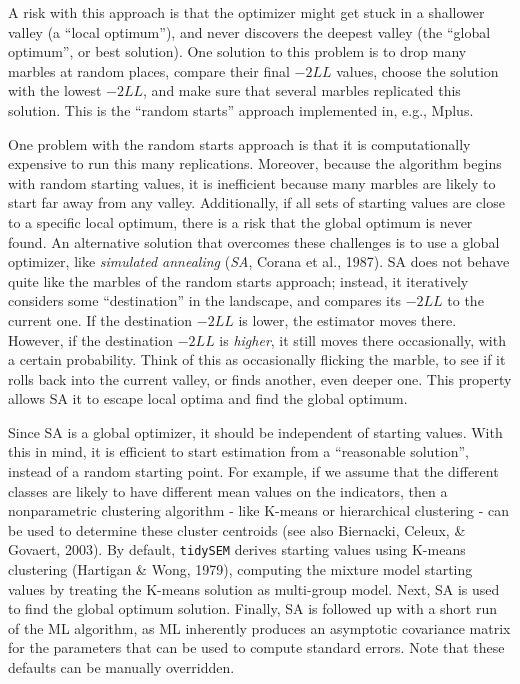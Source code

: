 \documentclass[
  ,man,floatsintext]{apa6}
\begin{document}
A risk with this approach is that the optimizer might get stuck in a shallower valley (a ``local optimum''),
and never discovers the deepest valley (the ``global optimum'', or best solution).
One solution to this problem is to drop many marbles at random places,
compare their final \(-2LL\) values,
choose the solution
with the lowest \(-2LL\), and make sure that several marbles replicated
this solution.
This is the ``random starts'' approach implemented in, e.g., Mplus.

One problem with the random starts approach is that it is
computationally expensive to run this many replications. Moreover,
because the algorithm begins with random starting values,
it is inefficient because many marbles are likely to start far away from any valley.
Additionally, if all sets of starting values are close to a specific local optimum,
there is a risk that the global optimum is never found.
An alternative solution that overcomes these challenges is to use a global optimizer, like \emph{simulated annealing} (\emph{SA}, Corana et al., 1987).
SA does not behave quite like the marbles of the random starts approach;
instead, it iteratively considers some ``destination'' in the landscape,
and compares its \(-2LL\) to the current one.
If the destination \(-2LL\) is lower,
the estimator moves there.
However, if the destination \(-2LL\) is \emph{higher},
it still moves there occasionally, with a certain probability.
Think of this as occasionally flicking the marble,
to see if it rolls back into the current valley, or finds another,
even deeper one.
This property allows SA it to escape local optima and find the global optimum.

Since SA is a global optimizer, it should be independent of starting values.
With this in mind, it is efficient to start estimation from a ``reasonable solution'', instead of a random starting point.
For example, if we assume that the different classes are likely to have different mean values on the indicators,
then a nonparametric clustering algorithm - like K-means or hierarchical clustering - can be used to determine these cluster centroids (see also Biernacki, Celeux, \& Govaert, 2003).
By default, \texttt{tidySEM} derives starting values using K-means clustering (Hartigan \& Wong, 1979),
computing the mixture model starting values by treating the K-means solution as multi-group model.
Next, SA is used to find the global optimum solution.
Finally, SA is followed up with a short run of the ML algorithm,
as ML inherently produces an asymptotic
covariance matrix for the parameters that can be used to compute
standard errors.
Note that these defaults can be manually overridden.
\end{document}
